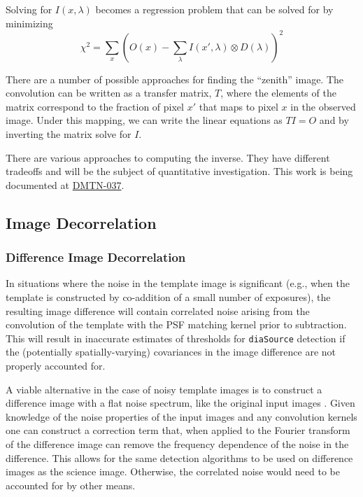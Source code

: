 Solving for $I(x,\lambda)$ becomes a regression problem that can be
solved for by minimizing
\begin{equation}
\chi^2 = \sum_x (O(x) - \sum_\lambda I(x',\lambda) \otimes D(\lambda))^2
\end{equation}

There are a number of possible approaches for finding the ``zenith''
image.  The convolution can be written as a transfer matrix, $T$,
where the elements of the matrix correspond to the fraction of pixel $x'$ that maps to pixel $x$ in the observed image. Under this mapping, we can write the linear equations as $TI=O$ and by inverting the matrix solve for $I$.

There are various approaches to computing the inverse.  They have different tradeoffs
and will be the subject of quantitative investigation.  This work is being
documented at \hyperref[https://dmtn-037.lsst.io/]{DMTN-037}.
\subsection{Image Decorrelation}
\label{sec:acImageDecorrelation}
\subsubsection{Difference Image Decorrelation}
\label{sec:acDiffImDecorrelation}

In situations where the noise in the template image is significant (e.g., when the template is constructed by co-addition of a small number of exposures), the resulting image difference will contain correlated noise arising from the convolution of the template with the PSF matching kernel prior to subtraction. This will result in inaccurate estimates of thresholds for \texttt{diaSource} detection if the (potentially spatially-varying) covariances in the image difference are not properly accounted for.

A viable alternative in the case of noisy template images is to construct a difference image with a flat noise spectrum, like the original input images \citep{Kaiser04, 2016ApJ...830...27Z}. Given knowledge of the noise properties of the input images and any convolution kernels one can construct a correction term that, when applied to the Fourier transform of the difference image can remove the frequency dependence of the noise in the difference.  This allows for the same detection algorithms to be used on difference images as the science image.  Otherwise, the correlated noise would need to be accounted for by other means.

